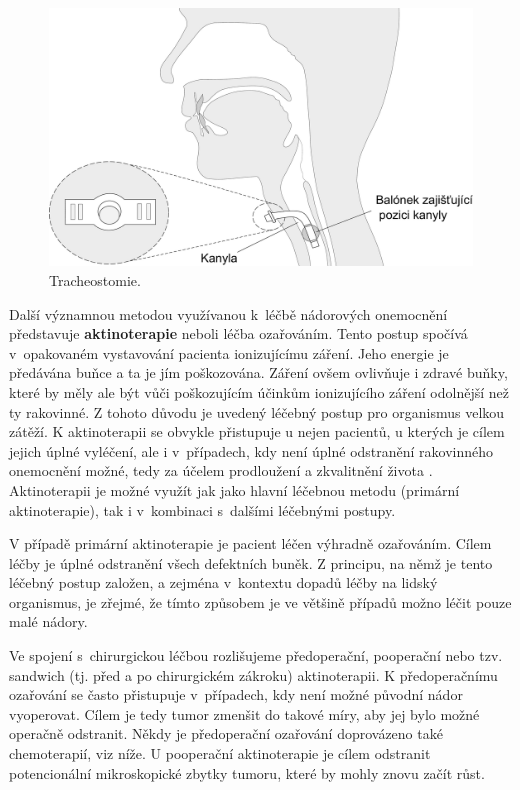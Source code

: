 \begin{figure}[htb]
  \begin{center}
    \def\svgwidth{0.9\linewidth}
    \includegraphics[width=0.9\linewidth]{ch3-cause/figures/tracheostomie}
    \caption[Tracheostomie.]{Tracheostomie.}
    \label{fig:cause:desease:tracheostomy}
  \end{center}
\end{figure}

Další významnou metodou využívanou  k~léčbě nádorových onemocnění představuje
\textbf{aktinoterapie} neboli léčba ozařováním. Tento postup spočívá v~opakovaném vystavování pacienta ionizujícímu záření. Jeho energie je předávána buňce a ta je jím poškozována. Záření ovšem ovlivňuje i
zdravé buňky, které by měly ale být vůči poškozujícím účinkům ionizujícího záření odolnější než ty rakovinné.
Z tohoto důvodu je uvedený léčebný postup pro organismus velkou zátěží.
K aktinoterapii se obvykle přistupuje u nejen pacientů, u kterých je cílem jejich úplné vyléčení, ale i v~případech, kdy není úplné odstranění rakovinného onemocnění možné, tedy za účelem prodloužení a zkvalitnění života \cite{Slavicek2000}. Aktinoterapii je možné využít jak jako hlavní léčebnou metodu (primární
aktinoterapie), tak i v~kombinaci s~dalšími léčebnými postupy.

V případě primární aktinoterapie je pacient léčen výhradně ozařováním. Cílem léčby je úplné odstranění všech defektních
buněk. Z principu, na němž je tento léčebný postup založen, a zejména v~kontextu dopadů léčby na lidský organismus, je zřejmé, že tímto způsobem je ve většině případů možno léčit pouze malé nádory.

Ve spojení s~chirurgickou léčbou rozlišujeme předoperační, pooperační nebo
tzv. sandwich (tj. před a po chirurgickém zákroku) aktinoterapii.
K předoperačnímu ozařování se často přistupuje v~případech, kdy není možné původní nádor vyoperovat.
Cílem je tedy tumor zmenšit do takové míry, aby jej bylo možné operačně
odstranit. Někdy je předoperační ozařování doprovázeno také chemoterapií, viz níže.
U pooperační aktinoterapie je cílem odstranit potencionální
mikroskopické zbytky tumoru, které by mohly znovu začít růst.

